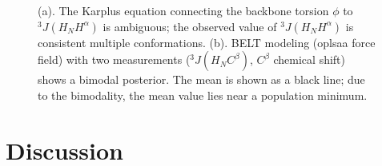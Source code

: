 \documentclass[11pt,titlepage]{article}
\begin{document}
\begin{figure}
\caption{
(a).  The Karplus equation connecting the backbone torsion $\phi$ to $^3J(H_NH^\alpha)$ is ambiguous; the observed value of $^3J(H_NH^\alpha)$ is consistent multiple conformations.  (b).  BELT modeling (oplsaa force field) with two measurements ($^3J(H_N C^\beta)$, $C^\beta$ chemical shift) shows a bimodal posterior.  The mean is shown as a black line; due to the bimodality, the mean value lies near a population minimum.
}
\label{figure:Ambiguity}

\end{figure}



\section*{Discussion}
\end{document}
